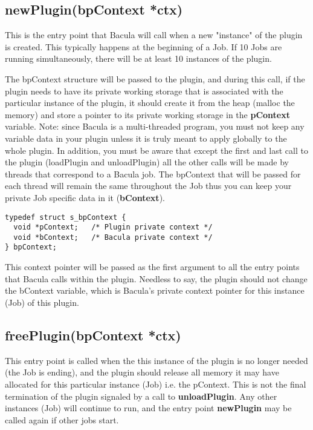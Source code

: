 \subsection{newPlugin(bpContext *ctx)}
  This is the entry point that Bacula will call
  when a new "instance" of the plugin is created. This typically
  happens at the beginning of a Job.  If 10 Jobs are running
  simultaneously, there will be at least 10 instances of the
  plugin.

  The bpContext structure will be passed to the plugin, and
  during this call, if the plugin needs to have its private
  working storage that is associated with the particular
  instance of the plugin, it should create it from the heap
  (malloc the memory) and store a pointer to
  its private working storage in the {\bf pContext} variable.
  Note: since Bacula is a multi-threaded program, you must not
  keep any variable data in your plugin unless it is truly meant
  to apply globally to the whole plugin.  In addition, you must
  be aware that except the first and last call to the plugin
  (loadPlugin and unloadPlugin) all the other calls will be
  made by threads that correspond to a Bacula job.  The
  bpContext that will be passed for each thread will remain the
  same throughout the Job thus you can keep your private Job specific
  data in it ({\bf bContext}).

\begin{verbatim}
typedef struct s_bpContext {
  void *pContext;   /* Plugin private context */
  void *bContext;   /* Bacula private context */
} bpContext;

\end{verbatim}

  This context pointer will be passed as the first argument to all
  the entry points that Bacula calls within the plugin.  Needless
  to say, the plugin should not change the bContext variable, which
  is Bacula's private context pointer for this instance (Job) of this
  plugin.

\subsection{freePlugin(bpContext *ctx)}
This entry point is called when the
this instance of the plugin is no longer needed (the Job is
ending), and the plugin should release all memory it may
have allocated for this particular instance (Job) i.e. the pContext.
This is not the final termination
of the plugin signaled by a call to {\bf unloadPlugin}.
Any other instances (Job) will
continue to run, and the entry point {\bf newPlugin} may be called
again if other jobs start.

